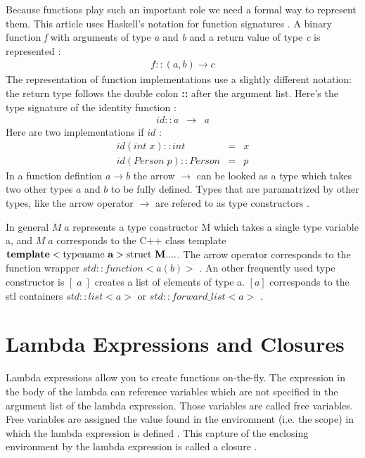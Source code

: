 \documentclass[12pt,fleqn]{article}
\begin{document}
Because functions play such an important role we need a formal way to represent them.
This article uses Haskell's notation for function signatures \cite{hutton}. 
A binary function {\em f}  with arguments of type {\em a} and {\em b} and a return value of type {\em c} is represented :
\begin{eqnarray*}
                              f::(a,b) \rightarrow c
\end{eqnarray*}
The representation of function implementations use a slightly different notation: 
the return type follows the double colon {\bf ::} after the argument list.
Here's the type signature of the identity function :
\begin{eqnarray*}
id :: a &\rightarrow& a 
\end{eqnarray*}
Here are two implementations if $id$ :
\begin{eqnarray*}
id (int \; x)::int  &=& x  \\
id (Person \; p)::Person &=& p 
\end{eqnarray*}
In a function defintion $a \rightarrow b$  the arrow $\rightarrow$  can be looked as a type which takes two other types $a$ and $b$ to be fully defined.
Types that are paramatrized by other types, like the arrow operator $\rightarrow$ are refered to as type constructors \cite{lipovaca}.

In general $M\;a$ represents a type constructor  M which takes a single type variable a, and
$M\;a$ corresponds to the C++ class template  
$ {\bf template}<\mbox{typename {\bf a}}> \mbox{struct {\bf M}} {....}$. 
The arrow operator corresponds to the function wrapper $std::function<a(b)>$ \cite{josuttis}. 
An other frequently used type constructor is $[\;a\;]$ creates a list of elements of type a.
$[a]$ corresponds to the stl containers $std::list<a>$ or $std::forward\_list<a>$ \cite{josuttis}.



\section*{Lambda Expressions and Closures}
Lambda expressions allow you to create functions on-the-fly. 
The expression in the body of the lambda can reference variables which are not specified in the argument list of the lambda expression. 
Those variables are called free variables. 
Free variables are assigned the value found in the environment (i.e. the scope) in which the lambda expression is defined \cite{field}. 
This capture of the enclosing environment by the lambda expression is called a closure \cite{field, scott}. 
\end{document}
